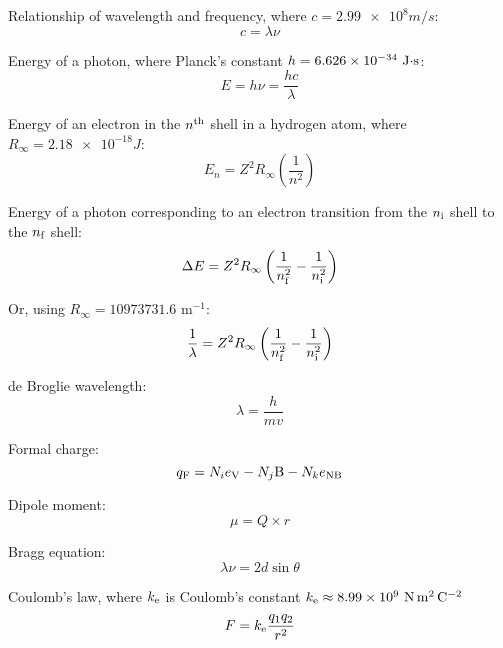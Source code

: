 \documentclass[10pt]{article}
\begin{document}
Relationship of wavelength and frequency, where $c=\num{2.99e8}\unit{m/s}$:
\begin{equation*}
c = \lambda\nu
\end{equation*}

Energy of a photon, where Planck's constant $h=\num{6.626e-34}\textnormal{ J$\cdot$s}$:
\begin{equation*}
E = h\nu = \frac{hc}{\lambda}
\end{equation*}

Energy of an electron in the $n^{\textnormal{th}}$ shell in a hydrogen atom, where $R_\infty=\num{2.18e-18}\unit{J}$:
\begin{equation*}
E_n=Z^2R_\infty\left(\frac{1}{n^2}\right)
\end{equation*}

Energy of a photon corresponding to an electron transition from the $n_\textnormal{i}$ shell to the $n_\textnormal{f}$ shell:
\begin{equation*}
\Delta E = Z^2R_\infty\left(\frac{1}{n_\textnormal{f}^2}-\frac{1}{n_\textnormal{i}^2}\right)
\end{equation*}

Or, using $R_\infty = 10973731.6$ m$^{-1}$:
\begin{equation*}
\frac{1}{\lambda} = Z^2R_\infty\left(\frac{1}{n_\textnormal{f}^2}-\frac{1}{n_\textnormal{i}^2}\right)
\end{equation*}

de Broglie wavelength:
\begin{equation*}
\lambda=\frac{h}{mv}
\end{equation*}

Formal charge:
\begin{equation*}
q_\textnormal{F} = N_ie_\textnormal{V} - N_j\textnormal{B} - N_ke_\textnormal{NB} 
\end{equation*}

Dipole moment:
\begin{equation*}
\mu = Q\times r
\end{equation*}

Bragg equation:
\begin{equation*}
\lambda\nu = 2d \sin \theta
\end{equation*}

Coulomb's law, where $k_\textnormal{e}$ is Coulomb's constant $k_{\textnormal{e}}\approx\num{8.99e9}~\si{\newton\meter\squared\per\coulomb\squared}$
\begin{equation*}
F = k_{\textnormal{e}}\frac{q_1q_2}{r^2}
\end{equation*}
\end{document}
